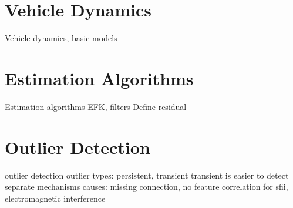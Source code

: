 
\section{Vehicle Dynamics}
Vehicle dynamics, basic models

\section{Estimation Algorithms}
Estimation algorithms EFK, filters
Define residual

\section{Outlier Detection}
outlier detection
outlier types: persistent, transient
transient is easier to detect
separate mechanisms
causes: missing connection, no feature correlation for sfii, electromagnetic interference
